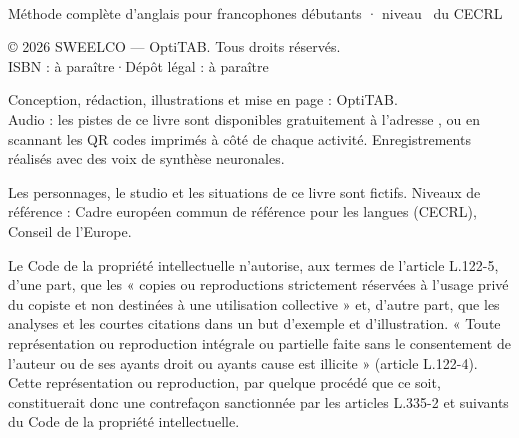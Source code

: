 \thispagestyle{empty}
\vspace*{\fill}
{\fontsize{8.6}{11.6}\selectfont\color{otMuted}
\\
Méthode complète d'anglais pour francophones débutants · niveau \otNiveau\ du CECRL\par\vspace{3mm}
\noindent© 2026 SWEELCO — OptiTAB. Tous droits réservés.\\
ISBN : à paraître\quad·\quad Dépôt légal : à paraître\par\vspace{3mm}
\noindent Conception, rédaction, illustrations et mise en page : OptiTAB.\\
Audio : les pistes de ce livre sont disponibles gratuitement à l'adresse \otAudioAffiche, ou en
scannant les QR codes imprimés à côté de chaque activité. Enregistrements réalisés avec des voix
de synthèse neuronales.\par\vspace{3mm}
\noindent Les personnages, le studio  et les situations de ce livre sont fictifs.
Niveaux de référence : Cadre européen commun de référence pour les langues (CECRL), Conseil de l'Europe.\par\vspace{3mm}
\noindent Le Code de la propriété intellectuelle n'autorise, aux termes de l'article L.122-5,
d'une part, que les « copies ou reproductions strictement réservées à l'usage privé du copiste et
non destinées à une utilisation collective » et, d'autre part, que les analyses et les courtes
citations dans un but d'exemple et d'illustration. « Toute représentation ou reproduction
intégrale ou partielle faite sans le consentement de l'auteur ou de ses ayants droit ou ayants
cause est illicite » (article L.122-4). Cette représentation ou reproduction, par quelque procédé
que ce soit, constituerait donc une contrefaçon sanctionnée par les articles L.335-2 et suivants
du Code de la propriété intellectuelle.\par}
\clearpage
